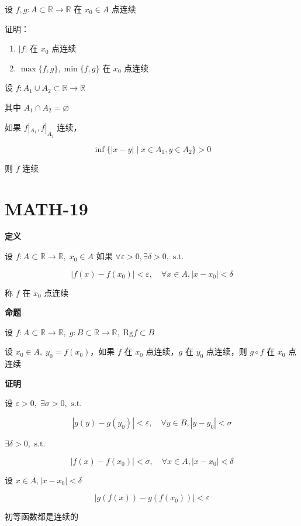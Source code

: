 设 \(f,g:A\subset \mathbb{R}\to \mathbb{R}\) 在 \(x_{0} \in A\) 点连续

证明：

\begin{enumerate}
\def\labelenumi{\arabic{enumi}.}
\tightlist
\item
  \(|f|\) 在 \(x_{0}\) 点连续
\item
  \(\max\{ f,g \}, \min\{ f, g \}\) 在 \(x_{0}\) 点连续
\end{enumerate}

设 \(f:A_{1} \cup A_{2} \subset \mathbb{R}\to \mathbb{R}\)

其中 \(A_{1}\cap A_{2}=\varnothing\)

如果 \(f|_{A_{1}}, f|_{A_{2}}\) 连续，

\[
\inf \{ |x-y| \mid x \in A_{1}, y \in A_{2} \} > 0
\]

则 \(f\) 连续

\section{MATH-19}\label{math-19}

\textbf{定义}

设 \(f:A\subset \mathbb{R}\to \mathbb{R}, \; x_{0} \in A\) 如果
\(\forall \varepsilon>0, \exists \delta>0,\text{ s.t.}\)

\[
|f(x)-f(x_{0})|<\varepsilon, \quad \forall x \in A, |x-x_{0}|<\delta
\]

称 \(f\) 在 \(x_{0}\) 点连续

\textbf{命题}

设
\(f:A\subset \mathbb{R}\to \mathbb{R}, \; g:B\subset \mathbb{R}\to \mathbb{R}, \; \mathrm{Rg} f\subset B\)

设 \(x_{0}\in A, \; y_{0}=f(x_{0})\)，如果 \(f\) 在 \(x_{0}\)
点连续，\(g\) 在 \(y_{0}\) 点连续，则 \(g\circ f\) 在 \(x_{0}\) 点连续

\textbf{证明}

设 \(\varepsilon>0, \; \exists \sigma >0,\text{ s.t.}\)

\[
|g(y)-g(y_{0})|<\varepsilon, \quad \forall y \in B, |y-y_{0}|<\sigma
\]

\(\exists \delta>0,\text{ s.t.}\)

\[
|f(x)-f(x_{0})|<\sigma, \quad \forall x \in A, |x-x_{0}|<\delta
\]

设 \(x \in A, |x-x_{0}|<\delta\)

\[
|g(f(x))-g(f(x_{0}))|<\varepsilon
\]

初等函数都是连续的

